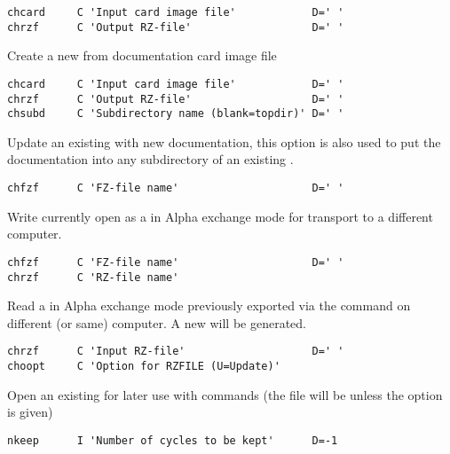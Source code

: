  
\begin{verbatim}
chcard     C 'Input card image file'            D=' '
chrzf      C 'Output RZ-file'                   D=' '
\end{verbatim}
 
Create a new \RZfile{} from documentation card image file
 
 
\begin{verbatim}
chcard     C 'Input card image file'            D=' '
chrzf      C 'Output RZ-file'                   D=' '
chsubd     C 'Subdirectory name (blank=topdir)' D=' '
\end{verbatim}
 
Update an existing \RZfile{} with new documentation, this option
is also used to put the documentation into any subdirectory
of an existing \RZfile.
 
 
\begin{verbatim}
chfzf      C 'FZ-file name'                     D=' '
\end{verbatim}
 
Write currently open \RZfile{} as a \FZfile{} in Alpha exchange mode for
transport to a different computer.
 
 
\begin{verbatim}
chfzf      C 'FZ-file name'                     D=' '
chrzf      C 'RZ-file name'
\end{verbatim}
 
Read a \FZfile{} in Alpha exchange mode previously exported via the
command  on different (or same) computer. 
A new \RZfile{} will be generated.
 
 
\begin{verbatim}
chrzf      C 'Input RZ-file'                    D=' '
choopt     C 'Option for RZFILE (U=Update)'
\end{verbatim}
 
Open an existing \RZfile{} for later use with  
commands
(the file will be  unless the  option is given)
 
 
\begin{verbatim}
nkeep      I 'Number of cycles to be kept'      D=-1
\end{verbatim}
 

